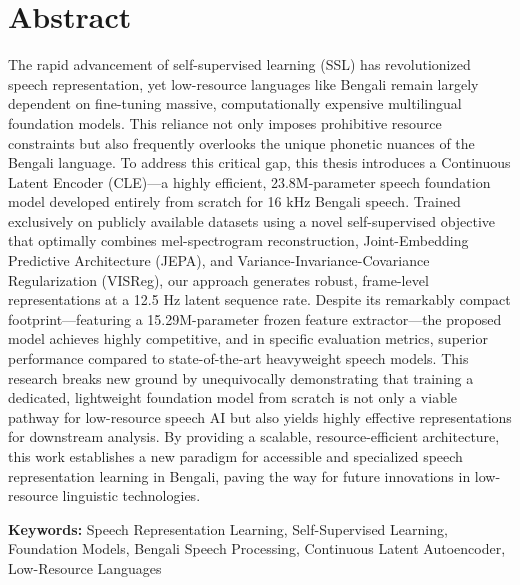\section*{Abstract}
The rapid advancement of self-supervised learning (SSL) has revolutionized speech representation, yet low-resource languages like Bengali remain largely dependent on fine-tuning massive, computationally expensive multilingual foundation models. This reliance not only imposes prohibitive resource constraints but also frequently overlooks the unique phonetic nuances of the Bengali language. To address this critical gap, this thesis introduces a Continuous Latent Encoder (CLE)—a highly efficient, 23.8M-parameter speech foundation model developed entirely from scratch for 16 kHz Bengali speech. Trained exclusively on publicly available datasets using a novel self-supervised objective that optimally combines mel-spectrogram reconstruction, Joint-Embedding Predictive Architecture (JEPA), and Variance-Invariance-Covariance Regularization (VISReg), our approach generates robust, frame-level representations at a 12.5 Hz latent sequence rate. Despite its remarkably compact footprint—featuring a 15.29M-parameter frozen feature extractor—the proposed model achieves highly competitive, and in specific evaluation metrics, superior performance compared to state-of-the-art heavyweight speech models. This research breaks new ground by unequivocally demonstrating that training a dedicated, lightweight foundation model from scratch is not only a viable pathway for low-resource speech AI but also yields highly effective representations for downstream analysis. By providing a scalable, resource-efficient architecture, this work establishes a new paradigm for accessible and specialized speech representation learning in Bengali, paving the way for future innovations in low-resource linguistic technologies.

\vspace{1cm}
\textbf{Keywords:} Speech Representation Learning, Self-Supervised Learning, Foundation Models, Bengali Speech Processing, Continuous Latent Autoencoder, Low-Resource Languages
\pagebreak

